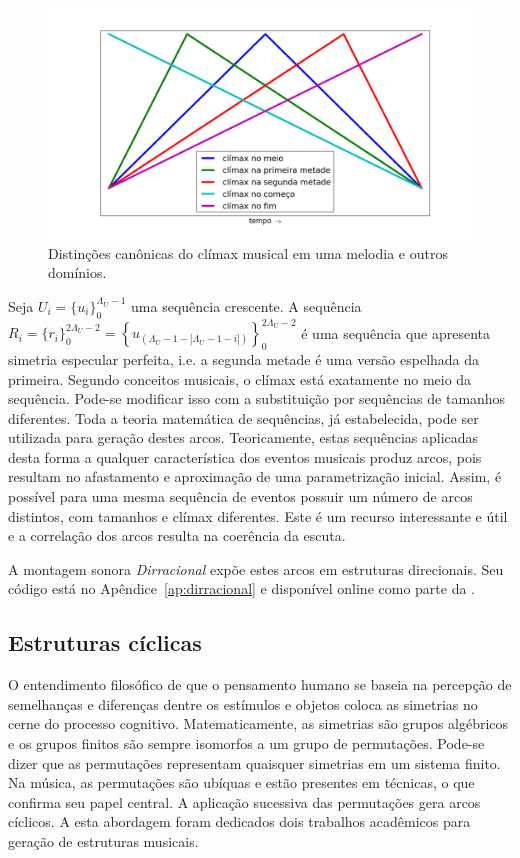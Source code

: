 \begin{figure}[h!]
    \centering
        \includegraphics[width=\textwidth]{figuras/climax}
    \caption{Distinções canônicas do clímax musical em uma melodia e outros domínios.}
        \label{fig:climax}
\end{figure}


Seja $U_i=\{u_i\}_0^{\Lambda_U-1}$ uma sequência crescente. A sequência 
$R_i=\{r_i\}_0^{2\Lambda_U -2}=\left\{u_{(\Lambda_U-1-|\Lambda_U-1-i|)}\right\}_0^{2\Lambda_U-2}$ 
é uma sequência que apresenta simetria especular perfeita, i.e. a segunda metade é uma versão espelhada da primeira. Segundo conceitos musicais, o clímax está exatamente no meio da sequência. Pode-se modificar isso com a substituição por sequências de tamanhos diferentes. Toda a teoria matemática de sequências, já estabelecida, pode ser utilizada para geração destes arcos.\cite{Guidorizzo,Schoenberg}
Teoricamente, estas sequências aplicadas desta forma
a qualquer característica dos eventos musicais produz arcos,
pois resultam no afastamento e aproximação de uma parametrização inicial. 
Assim, é possível para uma mesma sequência de eventos possuir um número de arcos distintos, com tamanhos e clímax diferentes. Este é um recurso
interessante e útil e a correlação dos arcos resulta na coerência da escuta.\cite{Salzer}

A montagem sonora \emph{Dirracional} expõe estes arcos em estruturas direcionais. Seu código está no Apêndice~\ref{ap:dirracional} e disponível online como parte da \massa.\cite{MASSA}

\subsection{Estruturas cíclicas}\label{estCic}

O entendimento filosófico de que o pensamento humano se baseia
na percepção de semelhanças e diferenças dentre os estímulos
e objetos coloca
as simetrias no cerne do processo cognitivo.\cite{Deleuze}
Matematicamente,
as simetrias são grupos algébricos e os grupos finitos
são sempre isomorfos a um grupo de permutações. 
Pode-se dizer que
as permutações representam quaisquer simetrias em um sistema finito.
Na música, as permutações são ubíquas
e estão presentes em técnicas, o que confirma seu papel central.
A aplicação sucessiva das permutações gera arcos cíclicos.\cite{change,Zamacois,permMusic}
A esta abordagem foram dedicados dois trabalhos acadêmicos para geração de estruturas musicais.\cite{figgusOriginal, figgusEspacializacao}

